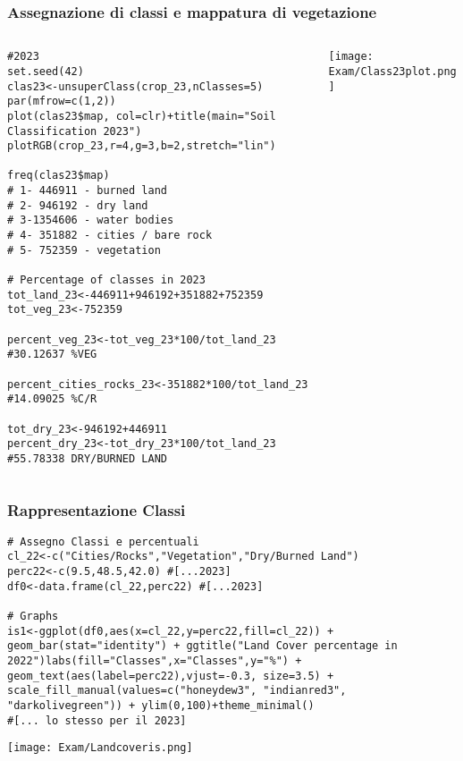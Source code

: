 \documentclass{beamer}
\begin{document}
\begin{frame}[fragile]
\frametitle{\scriptsize Assegnazione di classi e mappatura di vegetazione}
    \begin{columns}
        \begin{column}{0.45\textwidth}
            \begin{lstlisting}[style=mystyle]
#2023
set.seed(42) 
clas23<-unsuperClass(crop_23,nClasses=5)
par(mfrow=c(1,2))
plot(clas23$map, col=clr)+title(main="Soil Classification 2023")
plotRGB(crop_23,r=4,g=3,b=2,stretch="lin")

freq(clas23$map)
# 1- 446911 - burned land
# 2- 946192 - dry land
# 3-1354606 - water bodies
# 4- 351882 - cities / bare rock
# 5- 752359 - vegetation 

# Percentage of classes in 2023
tot_land_23<-446911+946192+351882+752359
tot_veg_23<-752359 

percent_veg_23<-tot_veg_23*100/tot_land_23 #30.12637 %VEG

percent_cities_rocks_23<-351882*100/tot_land_23 #14.09025 %C/R

tot_dry_23<-946192+446911
percent_dry_23<-tot_dry_23*100/tot_land_23 #55.78338 DRY/BURNED LAND

            \end{lstlisting}
        \end{column}
        
        \begin{column}{0.47\textwidth}
            \texttt{[image: Exam/Class23plot.png]}
        \end{column}
    \end{columns}

\end{frame}

\begin{frame}[fragile]
\frametitle{\scriptsize Rappresentazione Classi}
            \begin{lstlisting}[style=mystyle]
# Assegno Classi e percentuali
cl_22<-c("Cities/Rocks","Vegetation","Dry/Burned Land")
perc22<-c(9.5,48.5,42.0) #[...2023]
df0<-data.frame(cl_22,perc22) #[...2023]

# Graphs
is1<-ggplot(df0,aes(x=cl_22,y=perc22,fill=cl_22)) + geom_bar(stat="identity") + ggtitle("Land Cover percentage in 2022")labs(fill="Classes",x="Classes",y="%") + geom_text(aes(label=perc22),vjust=-0.3, size=3.5) + scale_fill_manual(values=c("honeydew3", "indianred3", "darkolivegreen")) + ylim(0,100)+theme_minimal()
#[... lo stesso per il 2023]

            \end{lstlisting}
        \vspace{0.5cm}
            \texttt{[image: Exam/Landcoveris.png]}

\end{frame}
\end{document}
